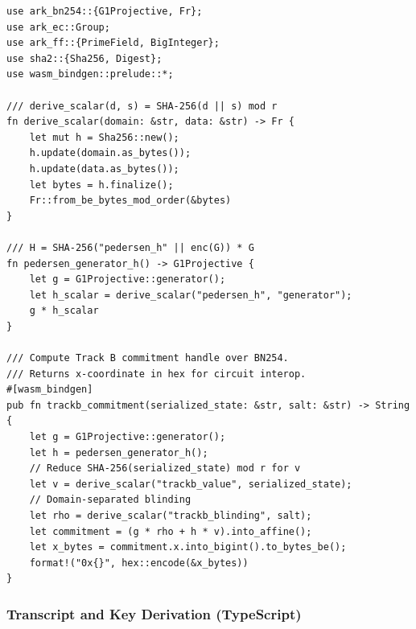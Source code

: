 \documentclass[11pt]{article}
\begin{document}
\begin{verbatim}
use ark_bn254::{G1Projective, Fr};
use ark_ec::Group;
use ark_ff::{PrimeField, BigInteger};
use sha2::{Sha256, Digest};
use wasm_bindgen::prelude::*;

/// derive_scalar(d, s) = SHA-256(d || s) mod r
fn derive_scalar(domain: &str, data: &str) -> Fr {
    let mut h = Sha256::new();
    h.update(domain.as_bytes());
    h.update(data.as_bytes());
    let bytes = h.finalize();
    Fr::from_be_bytes_mod_order(&bytes)
}

/// H = SHA-256("pedersen_h" || enc(G)) * G
fn pedersen_generator_h() -> G1Projective {
    let g = G1Projective::generator();
    let h_scalar = derive_scalar("pedersen_h", "generator");
    g * h_scalar
}

/// Compute Track B commitment handle over BN254.
/// Returns x-coordinate in hex for circuit interop.
#[wasm_bindgen]
pub fn trackb_commitment(serialized_state: &str, salt: &str) -> String {
    let g = G1Projective::generator();
    let h = pedersen_generator_h();
    // Reduce SHA-256(serialized_state) mod r for v
    let v = derive_scalar("trackb_value", serialized_state);
    // Domain-separated blinding
    let rho = derive_scalar("trackb_blinding", salt);
    let commitment = (g * rho + h * v).into_affine();
    let x_bytes = commitment.x.into_bigint().to_bytes_be();
    format!("0x{}", hex::encode(&x_bytes))
}
\end{verbatim}

\subsubsection{Transcript and Key Derivation (TypeScript)}
\end{document}
